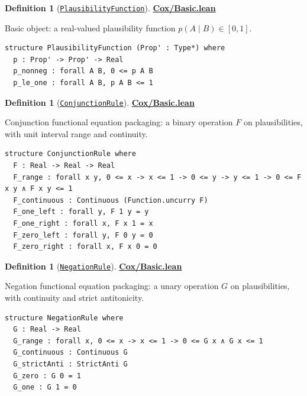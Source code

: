 \documentclass[11pt]{article}
\theoremstyle{definition}
\newtheorem{definition}[theorem]{Definition}
\theoremstyle{remark}
\begin{document}
\begin{definition}[\href{https://github.com/zariuq/ks-foundations-of-inference/blob/main/ProbabilityTheory/Cox/Basic.lean}{\texttt{PlausibilityFunction}}]
\textbf{\href{https://github.com/zariuq/ks-foundations-of-inference/blob/main/ProbabilityTheory/Cox/Basic.lean}{Cox/Basic.lean}}

Basic object: a real-valued plausibility function $p(A\mid B)\in[0,1]$.
\end{definition}

\begin{lstlisting}[caption={Cox plausibility function interface}]
structure PlausibilityFunction (Prop' : Type*) where
  p : Prop' -> Prop' -> Real
  p_nonneg : forall A B, 0 <= p A B
  p_le_one : forall A B, p A B <= 1
\end{lstlisting}

\begin{definition}[\href{https://github.com/zariuq/ks-foundations-of-inference/blob/main/ProbabilityTheory/Cox/Basic.lean}{\texttt{ConjunctionRule}}]
\textbf{\href{https://github.com/zariuq/ks-foundations-of-inference/blob/main/ProbabilityTheory/Cox/Basic.lean}{Cox/Basic.lean}}

Conjunction functional equation packaging: a binary operation $F$ on plausibilities, with unit interval
range and continuity.
\end{definition}

\begin{lstlisting}[caption={Cox conjunction rule interface}]
structure ConjunctionRule where
  F : Real -> Real -> Real
  F_range : forall x y, 0 <= x -> x <= 1 -> 0 <= y -> y <= 1 -> 0 <= F x y ∧ F x y <= 1
  F_continuous : Continuous (Function.uncurry F)
  F_one_left : forall y, F 1 y = y
  F_one_right : forall x, F x 1 = x
  F_zero_left : forall y, F 0 y = 0
  F_zero_right : forall x, F x 0 = 0
\end{lstlisting}

\begin{definition}[\href{https://github.com/zariuq/ks-foundations-of-inference/blob/main/ProbabilityTheory/Cox/Basic.lean}{\texttt{NegationRule}}]
\textbf{\href{https://github.com/zariuq/ks-foundations-of-inference/blob/main/ProbabilityTheory/Cox/Basic.lean}{Cox/Basic.lean}}

Negation functional equation packaging: a unary operation $G$ on plausibilities, with continuity and
strict antitonicity.
\end{definition}

\begin{lstlisting}[caption={Cox negation rule interface}]
structure NegationRule where
  G : Real -> Real
  G_range : forall x, 0 <= x -> x <= 1 -> 0 <= G x ∧ G x <= 1
  G_continuous : Continuous G
  G_strictAnti : StrictAnti G
  G_zero : G 0 = 1
  G_one : G 1 = 0
\end{lstlisting}
\end{document}
